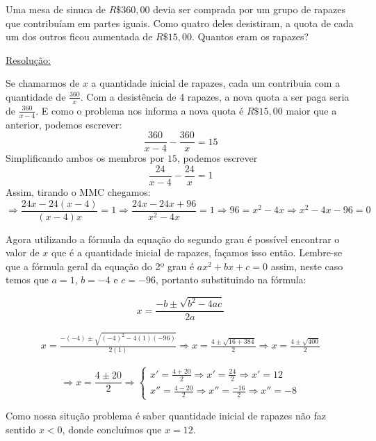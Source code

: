 \begin{exem}
 Uma mesa de sinuca de $R\$ 360,00$ devia ser comprada por um grupo de rapazes que contribuíam em partes iguais. Como quatro deles desistiram, a quota de cada um dos outros ficou aumentada de $R\$ 15,00$. Quantos eram os rapazes?

 \underline{Resolução:}

 Se chamarmos de $x$ a quantidade inicial de rapazes, cada um contribuia com a quantidade de $\frac{360}{x}$. Com a desistência de 4 rapazes, a nova quota a ser paga seria de $\frac{360}{x - 4}$. E como o problema nos informa a nova quota é $R\$ 15,00$ maior que a anterior, podemos escrever:
 \[\frac{360}{x - 4} - \frac{360}{x} = 15\]
 Simplificando ambos os membros por $15$, podemos escrever
 \[\frac{24}{x - 4} - \frac{24}{x} = 1\]
 Assim, tirando o MMC chegamos:
 \begin{equation*}
  \Rightarrow \frac{24 x - 24(x-4)}{(x - 4)x} = 1 \Rightarrow \frac{24x - 24x + 96}{x^2 - 4x} = 1
  \Rightarrow 96 = x^2 - 4x \Rightarrow x^2 - 4x - 96 = 0
 \end{equation*}

 Agora utilizando a fórmula da equação do segundo grau é possível encontrar o valor de $x$ que é a quantidade inicial de rapazes, façamos isso então. Lembre-se que a fórmula geral da equação do 2º grau é $ax^2 + bx + c = 0$ assim, neste caso temos que $a = 1$, $b = -4$ e $c = -96$, portanto substituindo na fórmula:

 \[ x= \frac{-b \pm \sqrt{b^2 - 4ac}}{2a} \]

 \begin{eqnarray*}
  x= \frac{-(-4) \pm \sqrt{(-4)^2 - 4(1)(-96)}}{2(1)} \Rightarrow
  x = \frac{4 \pm \sqrt{16 + 384}}{2} \Rightarrow
  x = \frac{4 \pm \sqrt{400}}{2}
 \end{eqnarray*}

\[ \Rightarrow x = \frac{4 \pm 20}{2} \Rightarrow \begin{cases}
                                                  x' = \frac{4 + 20}{2} \Rightarrow x' = \frac{24}{2} \Rightarrow x' = 12 \\
                                                  x'' = \frac{4 - 20}{2} \Rightarrow x'' = \frac{-16}{2} \Rightarrow x'' = -8
                                                 \end{cases}\]

Como nossa situção problema é saber quantidade inicial de rapazes não faz sentido $x < 0$, donde concluímos que $x = 12$.
\fim
\end{exem}



